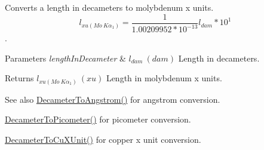 Converts a length in decameters to molybdenum x units. \[ l_{xu(Mo\ K\alpha_1)}=\frac{1}{1.00209952*10^{-13}} l_{dam} * 10^{1}\]. 


\begin{DoxyParams}{Parameters}
{\em length\+In\+Decameter} & $ l_{dam}\ (dam)$ Length in decameters. \\
\hline
\end{DoxyParams}
\begin{DoxyReturn}{Returns}
$ l_{xu(Mo\ K\alpha_1)}\ (xu)$ Length in molybdenum x units. 
\end{DoxyReturn}
\begin{DoxySeeAlso}{See also}
\mbox{\hyperlink{group___e_g_x_math-_conversions-_length_conversions-_s_i-_decameter-_non-_s_i_ga2ea722ea1c773432c2680fe6ebd67638}{Decameter\+To\+Angstrom()}} for angstrom conversion. 

\mbox{\hyperlink{group___e_g_x_math-_conversions-_length_conversions-_s_i-_decameter-_s_i_gab265bbced03f7b08cf4ad0db29da6dfd}{Decameter\+To\+Picometer()}} for picometer conversion. 

\mbox{\hyperlink{group___e_g_x_math-_conversions-_length_conversions-_s_i-_decameter-_non-_s_i_gaf256500ca4f0b7a62018ea61078c29e3}{Decameter\+To\+Cu\+X\+Unit()}} for copper x unit conversion. 
\end{DoxySeeAlso}
